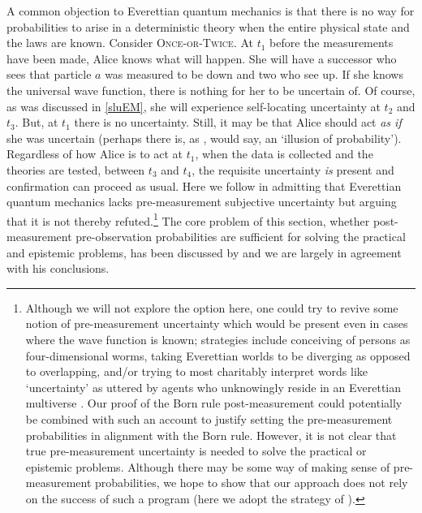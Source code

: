 \documentclass[12pt,onecolumn,secnumarabic,amsmath,amssymb,balancelastpage,nofootinbib]{article}
\begin{document}
A common objection to Everettian quantum mechanics is that there is no way for probabilities to arise in a deterministic theory when the entire physical state and the laws are known.  Consider \textsc{Once-or-Twice}.  At $t_1$ before the measurements have been made, Alice knows what will happen.  She will have a successor who sees that particle $a$ was measured to be down and two who see up.  If she knows the universal wave function, there is nothing for her to be uncertain of.  Of course, as was discussed in \textsection \ref{sluEM}, she will experience self-locating uncertainty at $t_2$ and $t_3$.  But, at $t_1$ there is no uncertainty.  Still, it may be that Alice should act \textit{as if} she was uncertain (perhaps there is, as \citeauthor{vaidman2011} \citeyear{vaidman2011}, \citeyear{vaidman2014} would say, an `illusion of probability').  Regardless of how Alice is to act at $t_1$, when the data is collected and the theories are tested, between $t_3$ and $t_4$, the requisite uncertainty \emph{is} present and confirmation can proceed as usual.  Here we follow \citet{greaves2004} in admitting that Everettian quantum mechanics lacks pre-measurement subjective uncertainty but arguing that it is not thereby refuted.\footnote{Although we will not explore the option here, one could try to revive some notion of pre-measurement uncertainty which would be present even in cases where the wave function is known; strategies include conceiving of persons as four-dimensional worms, taking Everettian worlds to be diverging as opposed to overlapping, and/or trying to most charitably interpret words like `uncertainty' as uttered by agents who unknowingly reside in an Everettian multiverse \citep[see][ch. 7]{saunders2008,saunders2010b,wilson2012b,wallace2012}.  Our proof of the Born rule post-measurement could  potentially be combined with such an account to justify setting the pre-measurement probabilities in alignment with the Born rule.  However, it is not clear that true pre-measurement uncertainty is needed to solve the practical or epistemic problems.  Although there may be some way of making sense of pre-measurement probabilities, we hope to show that our approach does not rely on the success of such a program (here we adopt the strategy of \citealp[]{greaves2007b}).\label{pbuncertainty}}  The core problem of this section, whether post-measurement pre-observation probabilities are sufficient for solving the practical and epistemic problems, has been discussed by \citet{tappenden2011} and we are largely in agreement with his conclusions.
\end{document}
